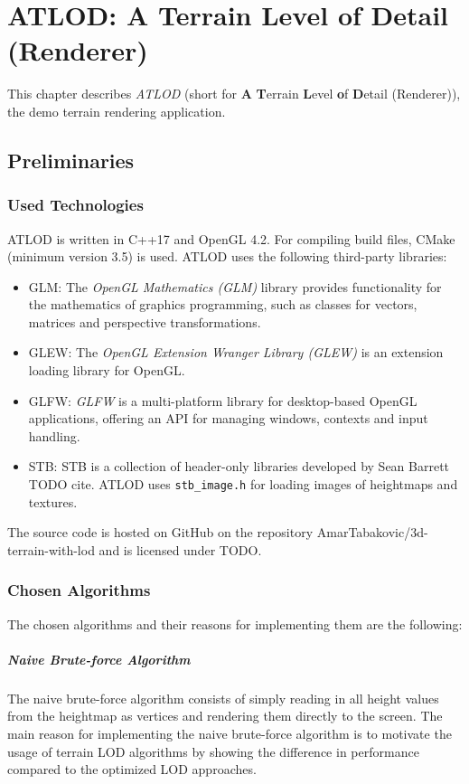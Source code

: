 \chapter{ATLOD: A Terrain Level of Detail (Renderer)}
This chapter describes \textit{ATLOD} (short for \textbf{A} \textbf{T}errain \textbf{L}evel \textbf{o}f \textbf{D}etail (Renderer)), the demo terrain rendering application.

\section{Preliminaries}
\subsection{Used Technologies}
ATLOD is written in C++17 and OpenGL 4.2.
For compiling build files, CMake (minimum version 3.5) is used.
ATLOD uses the following third-party libraries:
\begin{itemize}
  \item GLM: The \textit{OpenGL Mathematics (GLM)} library provides functionality for the mathematics of graphics programming, such as classes for vectors, matrices and perspective transformations.
  \item GLEW: The \textit{OpenGL Extension Wranger Library (GLEW)} is an extension loading library for OpenGL. 
  \item GLFW: \textit{GLFW} is a multi-platform library for desktop-based OpenGL applications, offering an API for managing windows, contexts and input handling.
  \item STB: STB is a collection of header-only libraries developed by Sean Barrett TODO cite. ATLOD uses \texttt{stb\_image.h} for loading images of heightmaps and textures.
\end{itemize}

The source code is hosted on GitHub on the repository AmarTabakovic/3d-terrain-with-lod
and is licensed under TODO.

\subsection{Chosen Algorithms}
The chosen algorithms and their reasons for implementing them are the following:
\paragraph{Naive Brute-force Algorithm} The naive brute-force algorithm consists of simply reading in all height values from the heightmap as vertices and rendering them directly to the screen.
The main reason for implementing the naive brute-force algorithm is to motivate the usage of terrain LOD algorithms by showing the difference in performance
compared to the optimized LOD approaches.

